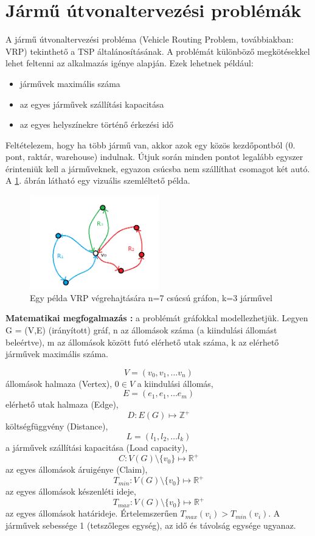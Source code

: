 \section{Jármű útvonaltervezési problémák \cite{alg_optim}}
A jármű útvonaltervezési probléma (Vehicle Routing Problem, továbbiakban: VRP) tekinthető a TSP általánosításának. A problémát különböző megkötésekkel lehet feltenni az alkalmazás igénye alapján. Ezek lehetnek például:
\begin{itemize}
	\item járművek maximális száma
	\item az egyes járművek szállítási kapacitása
	\item az egyes helyszínekre történő érkezési idő
\end{itemize}

Feltételezem, hogy ha több jármű van, akkor azok egy közös kezdőpontból (0. pont, raktár, warehouse) indulnak. Útjuk során minden pontot legalább egyszer érinteniük kell a járműveknek, egyazon csúcsba nem szállíthat csomagot két autó. A \ref{VRPpelda}. ábrán látható egy vizuális szemléltető példa.

\begin{figure}[ht!]
	\centering
	\includegraphics[width=0.5\textwidth]{figures/VRP_Szoveg_nelkul.png}
	\caption{Egy példa VRP végrehajtására n=7 csúcsú gráfon, k=3 járművel \label{VRPpelda} }
\end{figure}

\textbf{Matematikai megfogalmazás :} a problémát gráfokkal modellezhetjük.
\newline 
Legyen G = (V,E) (irányított) gráf, n az állomások száma (a kiindulási állomást beleértve), m az állomások között futó elérhető utak száma, k az elérhető járművek maximális száma.

\[ V = (v_0,v_1, \dots v_n )\]  állomások halmaza (Vertex), \(0 \in V\) a kiindulási állomás,
\[ E = (e_1,e_1, \dots e_m)\] elérhető utak halmaza (Edge),
\[ D : E(G) \mapsto \mathbb{Z}^+\] költségfüggvény (Distance),
\[ L = (l_1,l_2, \dots l_k)\] a járművek szállítási kapacitása (Load capacity),
\[ C : V(G)\setminus \{v_0\} \mapsto \mathbb{R}^+ \] az egyes állomások áruigénye (Claim),
\[ T_{min} :  V(G)\setminus \{v_0\} \mapsto \mathbb{R}^+ \] az egyes állomások készenléti ideje,
\[ T_{max} :  V(G)\setminus \{v_0\} \mapsto \mathbb{R}^+ \] az egyes állomások határideje. Értelemszerűen \(T_{max}(v_i) > T_{min}(v_i) \). A járművek sebessége 1 (tetszőleges egység), az idő és távolság egysége ugyanaz.

